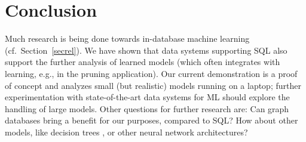 \documentclass{article}
\begin{document}
\section{Conclusion}

Much research is being done towards
in-database machine learning
(cf.~Section~\ref{secrel}).
We have shown that data systems supporting SQL also
support the further analysis of learned models (which often
integrates with learning, e.g., in the pruning application).  Our
current demonstration is a proof of concept and analyzes small
(but realistic) models running on a laptop; further
experimentation with state-of-the-art data systems for ML should
explore the handling of large models.
Other questions for further research are: Can graph
databases bring a benefit for our purposes, compared to
SQL\@?  How about other models, like decision trees
\cite{arenas-foil,arenas-dtfoil}, or other neural network
architectures?
\end{document}
